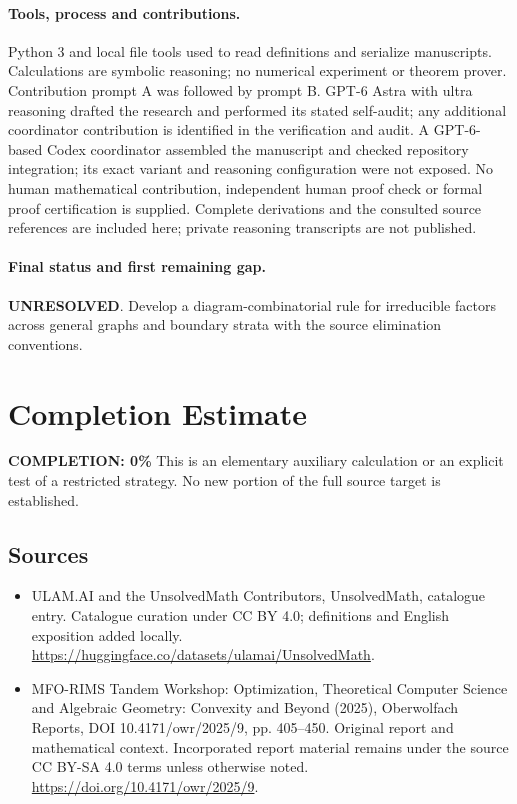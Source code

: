 \documentclass[11pt]{article}
\begin{document}
\paragraph{Tools, process and contributions.}
Python 3 and local file tools used to read definitions and serialize manuscripts. Calculations are symbolic reasoning; no numerical experiment or theorem prover. Contribution prompt A was followed by prompt B. GPT-6 Astra with ultra reasoning drafted the research and performed its stated self-audit; any additional coordinator contribution is identified in the verification and audit. A GPT-6-based Codex coordinator assembled the manuscript and checked repository integration; its exact variant and reasoning configuration were not exposed. No human mathematical contribution, independent human proof check or formal proof certification is supplied. Complete derivations and the consulted source references are included here; private reasoning transcripts are not published.

\paragraph{Final status and first remaining gap.}
\textbf{UNRESOLVED}. Develop a diagram-combinatorial rule for irreducible factors across general graphs and boundary strata with the source elimination conventions.

\section{Completion Estimate}
\noindent\textbf{COMPLETION: 0\%}
This is an elementary auxiliary calculation or an explicit test of a restricted strategy. No new portion of the full source target is established.

\subsection{Sources}
\begin{itemize}
\item[\hypertarget{source:statement:1}{S1}] ULAM.AI and the UnsolvedMath Contributors, UnsolvedMath, catalogue entry. Catalogue curation under CC BY 4.0; definitions and English exposition added locally.
\url{https://huggingface.co/datasets/ulamai/UnsolvedMath}.
\item[\hypertarget{source:statement:2}{S2}] MFO-RIMS Tandem Workshop: Optimization, Theoretical Computer Science and Algebraic Geometry: Convexity and Beyond (2025), Oberwolfach Reports, DOI 10.4171/owr/2025/9, pp. 405--450. Original report and mathematical context. Incorporated report material remains under the source CC BY-SA 4.0 terms unless otherwise noted.
\url{https://doi.org/10.4171/owr/2025/9}.
\end{itemize}
\label{end:statement}
\end{document}
